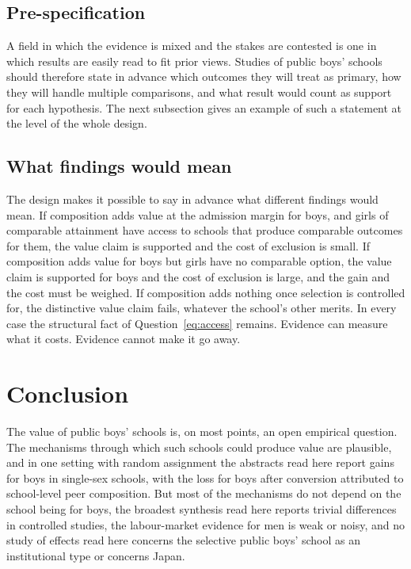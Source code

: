 \documentclass[11pt]{article}
\newcounter{mech}
\begin{document}
\subsection{Pre-specification}

A field in which the evidence is mixed and the stakes are contested is one in which results are easily read to fit prior views. Studies of public boys' schools should therefore state in advance which outcomes they will treat as primary, how they will handle multiple comparisons, and what result would count as support for each hypothesis. The next subsection gives an example of such a statement at the level of the whole design.

\subsection{What findings would mean}

The design makes it possible to say in advance what different findings would mean. If composition adds value at the admission margin for boys, and girls of comparable attainment have access to schools that produce comparable outcomes for them, the value claim is supported and the cost of exclusion is small. If composition adds value for boys but girls have no comparable option, the value claim is supported for boys and the cost of exclusion is large, and the gain and the cost must be weighed. If composition adds nothing once selection is controlled for, the distinctive value claim fails, whatever the school's other merits. In every case the structural fact of Question~\ref{eq:access} remains. Evidence can measure what it costs. Evidence cannot make it go away.

\section{Conclusion}\label{sec:conclusion}

The value of public boys' schools is, on most points, an open empirical question. The mechanisms through which such schools could produce value are plausible, and in one setting with random assignment the abstracts read here report gains for boys in single-sex schools, with the loss for boys after conversion attributed to school-level peer composition. But most of the mechanisms do not depend on the school being for boys, the broadest synthesis read here reports trivial differences in controlled studies, the labour-market evidence for men is weak or noisy, and no study of effects read here concerns the selective public boys' school as an institutional type or concerns Japan.
\end{document}
